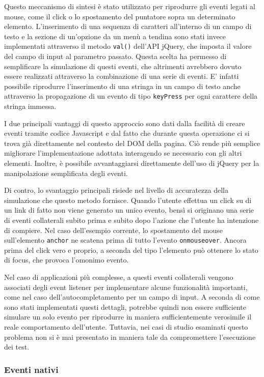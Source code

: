 \documentclass[12pt]{toptesi}
\begin{document}
Questo meccanismo di sintesi è stato utilizzato per riprodurre gli eventi legati al mouse, come il click o lo spostamento del puntatore sopra un determinato elemento. L'inserimento di una sequenza di caratteri all'interno di un campo di testo e la sezione di un'opzione da un menù a tendina sono stati invece implementati attraverso il metodo \verb|val()| dell'API jQuery, che imposta il valore del campo di input al parametro passato. Questa scelta ha permesso di semplificare la simulazione di questi eventi, che altrimenti avrebbero dovuto essere realizzati attraverso la combinazione di una serie di eventi. E' infatti possibile riprodurre l'inserimento di una stringa in un campo di testo anche attraverso la propagazione di un evento di tipo \verb|keyPress| per ogni carattere della stringa immessa.

I due principali vantaggi di questo approccio sono dati dalla facilità di creare eventi tramite codice Javascript e dal fatto che durante questa operazione ci si trova già direttamente nel contesto del DOM della pagina. Ciò rende più semplice migliorare l'implementazione adottata interagendo se necessario con gli altri elementi. Inoltre, è possibile avvantaggiarsi direttamente dell'uso di jQuery per la manipolazione semplificata degli eventi.

Di contro, lo svantaggio principali risiede nel livello di accuratezza della simulazione che questo metodo fornisce. Quando l'utente effettua un click su di un link di fatto non viene generato un unico evento, bensì si originano una serie di eventi collaterali subito prima e subito dopo l'azione che l'utente ha intenzione di compiere. Nel caso dell'esempio corrente, lo spostamento del mouse sull'elemento \verb|anchor| ne scatena prima di tutto l'evento \verb|onmouseover|. Ancora prima del click vero e proprio, a seconda del tipo l'elemento può ottenere lo stato di focus, che provoca l'omonimo evento.

Nel caso di applicazioni più complesse, a questi eventi collaterali vengono associati degli event listener per implementare alcune funzionalità importanti, come nel caso dell'autocompletamento per un campo di input. A seconda di come sono stati implementati questi dettagli, potrebbe quindi non essere sufficiente simulare un solo evento per riprodurre in maniera sufficientemente verosimile il reale comportamento dell'utente. Tuttavia, nei casi di studio esaminati questo problema non si è mai presentato in maniera tale da compromettere l'esecuzione dei test.

\subsubsection{Eventi nativi}
\end{document}
